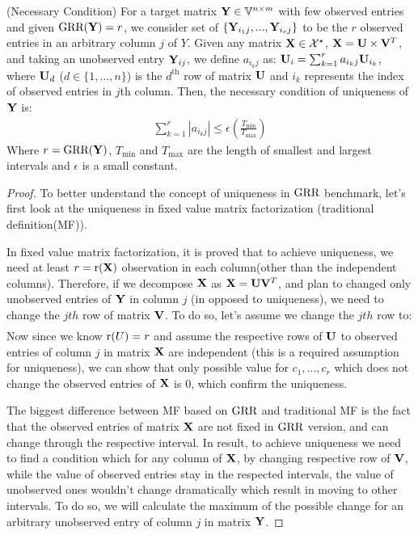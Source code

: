 \documentclass{article}
\begin{document}
\begin{thm:thm} (Necessary Condition)
For a target matrix $\mathbf{Y} \in \mathbb{V}^{n \times m}$ with few observed entries and given $\text{GRR}(\mathbf{Y})=r$, we consider set of $\{\mathbf{Y}_{i_1j},...,\mathbf{Y}_{i_rj}\}$ to be the $r$ observed entries in an arbitrary column $j$ of $Y$. 
Given any matrix $\mathbf{X} \in \mathcal{X}^{\star}$, $\mathbf{X}=\mathbf{U}\times \mathbf{V}^{T}$, and taking an unobserved entry $\mathbf{Y}_{ij}$, we define $a_{i_kj}$ as: 
$
\mathbf{U}_i=\sum_{k=1}^{r} a_{i_kj} \mathbf{U}_{i_k} 
$, where $\mathbf{U}_d$ ($d \in \{1,...,n\}$) is the $d^\text{th}$ row of matrix $\mathbf{U}$ and $i_k$ represents the index of observed entries in $j$th column.
Then, the necessary condition of uniqueness of $\mathbf{Y}$ is:
\begin{align}
\sum_{k=1}^{r}\left | a_{i_kj} \right | \leq  \epsilon\left(\frac{T_\text{min}}{T_\text{max}}\right)
\end{align}
Where $r=\text{GRR}(\mathbf{Y})$, $T_\text{min}$ and $T_\text{max}$ are the length of smallest and largest intervals and $\epsilon$ is a small constant. 
\begin{proof}
To better understand the concept of uniqueness in $\text{GRR}$ benchmark, let's first look at the uniqueness in fixed value matrix factorization (traditional definition(MF)).

 In fixed value matrix factorization, it is proved that to achieve uniqueness, we need at least $r=\mathrm{r}(\mathbf{X})$ observation in each column(other than the independent columns). Therefore, if we decompose $\mathbf{X}$ as $\mathbf{X}=\mathbf{U}\mathbf{V}^T$, and plan to changed only unobserved entries of $\mathbf{Y}$ in column $j$ (in opposed to uniqueness), we need to change the $jth$ row of matrix $\mathbf{V}$. To do so, let's assume we change the $jth$ row to:
 \begin{align}
[\V_{j1}+c_1,...,\V_{jr}+c_r]
\end{align}
Now since we know $\mathrm{r}(U)=r$ and assume the respective rows of $\mathbf{U}$ to observed entries of column $j$ in matrix $\mathbf{X}$ are independent (this is a required assumption for uniqueness), we can show that only possible value for $c_1,..., c_r$ which does not change the observed entries of $\mathbf{X}$ is $0$, which confirm the uniqueness.  

The biggest difference between MF based on $\text{GRR}$ and traditional MF is the fact that the observed entries of matrix $\mathbf{X}$ are not fixed in $\text{GRR}$ version, and can change through the respective interval. In result, to achieve uniqueness we need to find a condition which for any column of $\mathbf{X}$, by changing respective row of $\mathbf{V}$, while the value of observed entries stay in the respected intervals, the value of unobserved ones wouldn't change dramatically which result in moving to other intervals. To do so, we will calculate the maximum of the possible change for an arbitrary unobserved entry of column $j$ in matrix $\mathbf{Y}$.


\end{proof}
\end{thm:thm}
\end{document}

